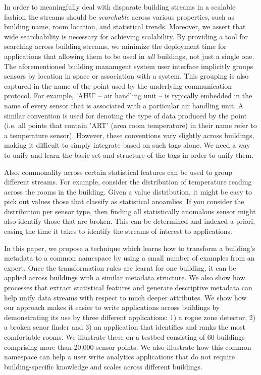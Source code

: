 In order to meaningfully deal with disparate building streams in a scalable 
fashion the streams should be \emph{searchable} across various properties, such
as building name, room location, and statistical trends.  Moreover, we
assert that wide searchability is necessary for achieving scalability.  By providing a tool for
searching across building streams, we minimize the deployment time for applications that 
allowing them to be used in \emph{all} buildings, not just a single one.  The aforementioned 
building manamgent system user interface implicitly groups sensors by location in space
or association with a system.  This grouping is also captured in the name of the point used by
the underlying communication protocol.  For example, 'AHU' -- air handling unit -- is typically
embedded in the name of every sensor that is associated with a particular air handling unit.
A similar convention is used for denoting the type of data produced by the point (i.e. all points
that contain 'ART' (area room temperature)  in their name refer to a temperature sensor).
However, these conventions vary slightly across buildings, making it difficult to
simply integrate based on such tags alone.  We need a way to unify and learn the basic
set and structure of the tags in order to unify them.

Also, commonality across certain statistical features can be used to group
different streams.  For example, consider the distribution of temperature reading across
the rooms in the building.  Given a value distribution, it might be easy to pick out values those
that classify as statistical anoamlies.  If you consider the distribution per sensor type, then
finding all statistically anomalous sensor might also identify those that are broken.
This can be determined and indexed a priori, easing the time it takes to identify the 
streams of interest to applications.

In this paper, we propose a technique which learns how to transform a building's metadata 
to a common namespace by using a small number of examples from an expert. Once the transformation 
rules are learnt for one building, it can be applied across buildings with a similar 
metadata structure.  We also show how processes that extract statistical features and generate
descriptive metadata can help unify data streams with respect to much deeper attributes.
We show how our approach makes it easier to write applications across buildings by
demonstrating its use by three different applications: 1) a rogue zone detector, 2)
a broken senor finder and 3) an application that identifies and ranks the most comfortable
rooms. We illustrate these on a testbed consisting of 60 buildings comprising more 
than 20,000 sensor points. We also illustrate how this common namespace can help a user write 
analytics applications that do not require building-specific knowledge and scales across 
different buildings. 

